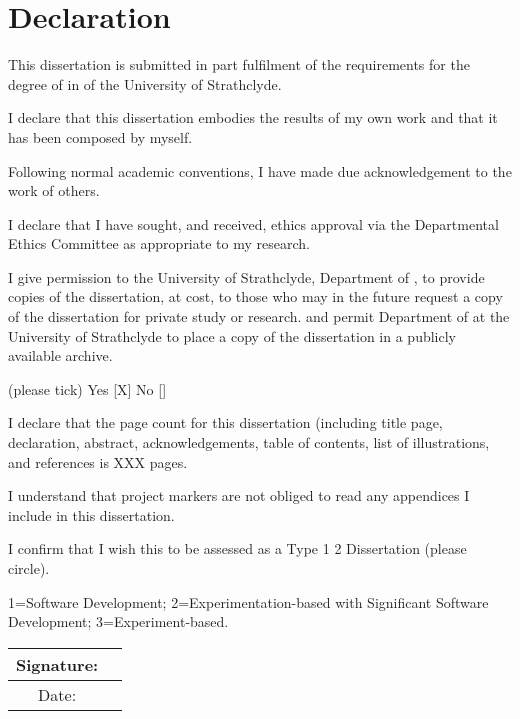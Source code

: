 \section*{Declaration}
This dissertation is submitted in part fulfilment of the requirements for the degree of \degreename
in \coursename of the University of Strathclyde. 

I declare that this dissertation embodies the results of my own work and that it has been composed by myself. 

Following normal academic conventions, I have made due acknowledgement to the work of others. 

I declare that I have sought, and received, ethics approval via the Departmental Ethics Committee as appropriate to my research. 

I give permission to the University of Strathclyde, Department of \deptname, to provide copies of the dissertation, at cost, to those who may in the future request a copy of the dissertation for private study or research. 
and permit  Department of \deptname at the University of Strathclyde to place a copy of the dissertation in a publicly available archive. 

(please tick) Yes [X] No [\quad] 

I declare that the page count for this dissertation (including title page, declaration, abstract, acknowledgements, table of contents, list of illustrations, and references  is XXX pages. %

I understand that project markers are not obliged to read any appendices I include in this dissertation.


I confirm that I wish this to be assessed as a Type 1 2   Dissertation (please circle).

{\small 1=Software Development;
2=Experimentation-based with Significant Software Development;
3=Experiment-based.}


\begin{tabular}{|c|p{8cm}|}
\hline
 Signature:    &  \\ \hline
 Date:    & \\ \hline
\end{tabular}

